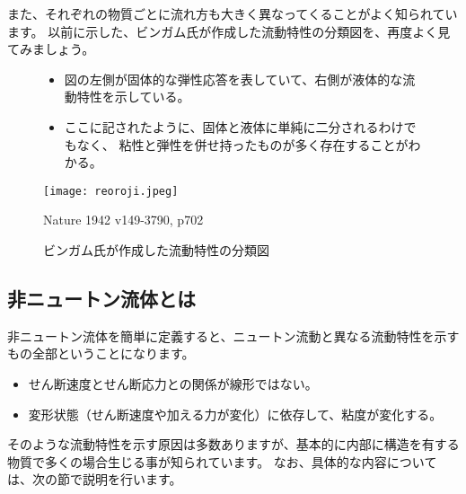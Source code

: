 \documentclass[uplatex,dvipdfmx,a4paper,11pt]{jsarticle}
\begin{document}
また、それぞれの物質ごとに流れ方も大きく異なってくることがよく知られています。
以前に示した、ビンガム氏が作成した流動特性の分類図を、再度よく見てみましょう。
\begin{figure}[htb]
	\begin{center}
		\begin{minipage}{0.9\textwidth}
			\begin{itemize}
				\item 図の左側が固体的な弾性応答を表していて、右側が液体的な流動特性を示している。
				\item ここに記されたように、固体と液体に単純に二分されるわけでもなく、
				粘性と弾性を併せ持ったものが多く存在することがわかる。
			\end{itemize}
		\end{minipage}
		\begin{minipage}{0.9\textwidth}
			\begin{center}
			\texttt{[image: reoroji.jpeg]}

			Nature 1942 v149-3790, p702
			\end{center}
		\end{minipage}
		\caption{ビンガム氏が作成した流動特性の分類図}
	\end{center}
\end{figure}

\subsection{非ニュートン流体とは}

非ニュートン流体を簡単に定義すると、ニュートン流動と異なる流動特性を示すもの全部ということになります。
\begin{itemize}
	\item せん断速度とせん断応力との関係が線形ではない。
	\item 変形状態（せん断速度や加える力が変化）に依存して、粘度が変化する。
\end{itemize}

そのような流動特性を示す原因は多数ありますが、基本的に内部に構造を有する物質で多くの場合生じる事が知られています。
なお、具体的な内容については、次の節で説明を行います。
\end{document}
